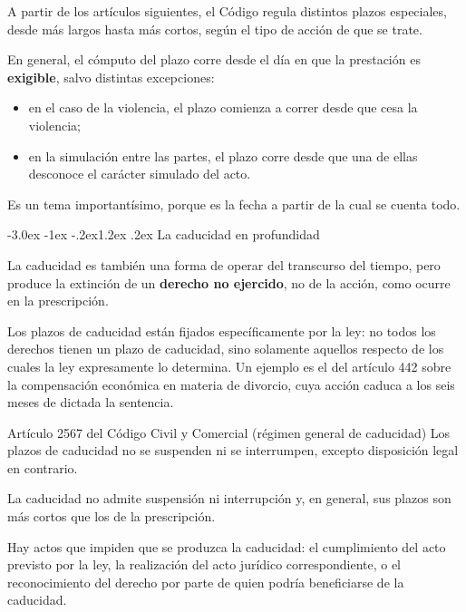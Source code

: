 \documentclass[12pt,oneside]{book}
\makeatletter
\renewcommand\section{\@startsection{section}{1}{\z@}%
  {-3.0ex \@plus -1ex \@minus -.2ex}{1.2ex \@plus .2ex}%
  {\normalfont\large\bfseries\color{acento}}}
\makeatother
\begin{document}
A partir de los artículos siguientes, el Código regula distintos plazos especiales, desde más largos hasta más cortos, según el tipo de acción de que se trate.

En general, el cómputo del plazo corre desde el día en que la prestación es \textbf{exigible}, salvo distintas excepciones:
\begin{itemize}
    \item en el caso de la violencia, el plazo comienza a correr desde que cesa la violencia;
    \item en la simulación entre las partes, el plazo corre desde que una de ellas desconoce el carácter simulado del acto.
\end{itemize}

\begin{importante}
Es un tema importantísimo, porque es la fecha a partir de la cual se cuenta todo.
\end{importante}

\section{La caducidad en profundidad}

La caducidad es también una forma de operar del transcurso del tiempo, pero produce la extinción de un \textbf{derecho no ejercido}, no de la acción, como ocurre en la prescripción.

Los plazos de caducidad están fijados específicamente por la ley: no todos los derechos tienen un plazo de caducidad, sino solamente aquellos respecto de los cuales la ley expresamente lo determina. Un ejemplo es el del artículo 442 sobre la compensación económica en materia de divorcio, cuya acción caduca a los seis meses de dictada la sentencia.

\begin{articulo}{Artículo 2567 del Código Civil y Comercial (régimen general de caducidad)}
Los plazos de caducidad no se suspenden ni se interrumpen, excepto disposición legal en contrario.
\end{articulo}

La caducidad no admite suspensión ni interrupción y, en general, sus plazos son más cortos que los de la prescripción.

Hay actos que impiden que se produzca la caducidad: el cumplimiento del acto previsto por la ley, la realización del acto jurídico correspondiente, o el reconocimiento del derecho por parte de quien podría beneficiarse de la caducidad.
\end{document}
